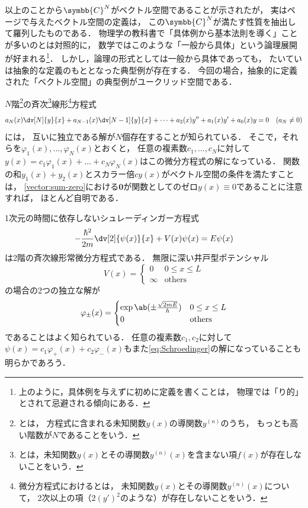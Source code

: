 \documentclass[
]{sotsu}
\begin{document}
以上のことから$\symbb{C}^N$がベクトル空間であることが示されたが，
実は\pageref{sec:definition-of-vector-space}ページで与えたベクトル空間の定義は，
この$\symbb{C}^N$が満たす性質を抽出して羅列したものである．
物理学の教科書で「具体例から基本法則を導く」ことが多いのとは対照的に，
数学ではこのような「一般から具体」という論理展開が好まれる\footnote{
    上のように，具体例を与えずに初めに定義を書くことは，
    物理では「り的」とされて忌避される傾向にある．
}．
しかし，論理の形式としては一般から具体であっても，
たいていは抽象的な定義のもととなった典型例が存在する．
今回の場合，抽象的に定義された「ベクトル空間」の典型例がユークリッド空間である．


\quad
$N$階\footnote{
    とは，
    方程式に含まれる未知関数$y(x)$の導関数$y^{(n)}$のうち，
    もっとも高い階数が$N$であることをいう．
}の斉次\footnote{
    とは，未知関数$y(x)$とその導関数$y^{(n)} (x)$を含まない項$f(x)$が存在しないことをいう．
}線形\footnote{
    微分方程式におけるとは，
    未知関数$y(x)$とその導関数$y^{(n)} (x)$について，
    2次以上の項（$2 (y')^2$のような）が存在しないことをいう．
}方程式
\begin{equation}
    \label{eq:N-differential-equation}
    a_N (x) \dv[N]{y}{x} + a_{N-1} (x) \dv[N-1]{y}{x}
        + \dots + a_2 (x) y'' + a_1 (x) y' + a_0 (x) y = 0
    \quad (a_N \neq 0)
\end{equation}
には，
互いに独立である解が$N$個存在することが知られている．
そこで，それらを$\varphi_1 (x), \dots, \varphi_N (x)$とおくと，
任意の複素数$c_1, \dots, c_N$に対して$y(x) = c_1 \varphi_1 (x) + \dots + c_N \varphi_N (x)$はこの微分方程式の解になっている．
関数の和$y_1 (x) + y_2 (x)$とスカラー倍$c y(x)$がベクトル空間の条件を満たすことは，
\cref{vector:sum-zero}における$\symbf{0}$が関数としてのゼロ$y(x) \equiv 0$であることに注意すれば，
ほとんど自明である．

1次元の時間に依存しないシュレーディンガー方程式
\begin{equation}
    \label{eq:Schroedinger}
    -\frac{\hbar^2}{2m} \dv[2]{\psi(x)}{x} + V(x) \psi(x) = E \psi(x)
\end{equation}
は2階の斉次線形常微分方程式である．
無限に深い井戸型ポテンシャル
\begin{equation*}
    V(x) = 
    \begin{cases}
        0      &  0 \leq x \leq L  \\
        \infty &  \text{others}
    \end{cases}
\end{equation*}
の場合の2つの独立な解が
\begin{equation*}
    \varphi_{\pm} (x) = 
    \begin{cases}
        \exp \ab(\pm \frac{\sqrt{2 m E}}{\hbar})  &  0 \leq x \leq L  \\
        0  &  \text{others}
    \end{cases}
\end{equation*}
であることはよく知られている．
任意の複素数$c_1, c_2$に対して$\psi(x) = c_1 \varphi_{+} (x) + c_2 \varphi_{-} (x)$もまた\cref{eq:Schroedinger}の解になっていることも明らかであろう．
\end{document}

